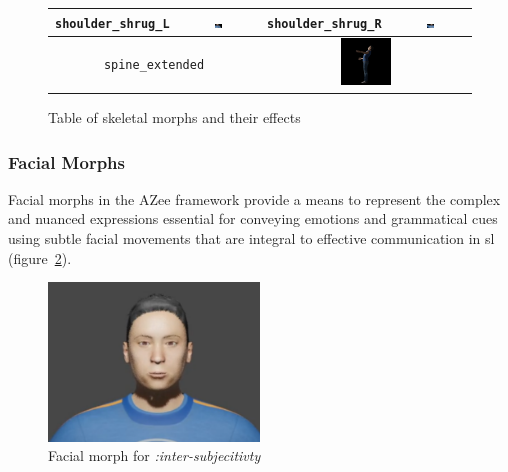 \documentclass[../../main.tex]{subfiles}
\begin{document}
{\begin{figure}
\begin{tabular}{|c|c|c|c|}
        \texttt{shoulder\_shrug\_L} & \includegraphics[width=0.1\textwidth]{chapters/avatar_creation_pose_synthesis/images/morph_renders/shoulder_shrug_L_morph.png} &
        \texttt{shoulder\_shrug\_R} & \includegraphics[width=0.1\textwidth]{chapters/avatar_creation_pose_synthesis/images/morph_renders/shoulder_shrug_R_morph.png} \\

        \hline
        \multicolumn{2}{|c|}{\texttt{spine\_extended}} &
        \multicolumn{2}{c|}{\centering\includegraphics[width=0.25\textwidth]{chapters/avatar_creation_pose_synthesis/images/morph_renders/spine_extended_morph.png}} \\
        \hline
    \end{tabular}
    \caption{Table of skeletal morphs and their effects}
    \label{fig:skeletal_morphs}
\end{figure}


\subsubsection{Facial Morphs}
\label{ch:avatar_creation_pose_synthesis:proc_rig_signing_avatars:morph_constraints:facial_morphs}

Facial morphs in the AZee framework provide a means to represent the complex and nuanced expressions essential for conveying emotions and grammatical cues using subtle facial movements that are integral to effective communication in \gls{sl} (figure~\ref{fig:facial_example}).

\begin{figure}
    \centering
    \includegraphics[width=0.5\textwidth]{chapters/avatar_creation_pose_synthesis/images/facial_example.png}
    \caption{Facial morph for \emph{:inter-subjecitivty}}
    \label{fig:facial_example}
\end{figure}

}
\end{document}

